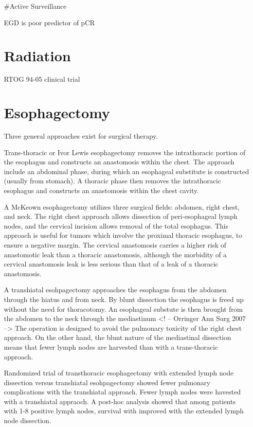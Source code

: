 \documentclass[
]{book}
\begin{document}
\#Active Surveillance

EGD is poor predictor of pCR \citep{sarkaria764}

\hypertarget{radiation}{%
\chapter{Radiation}\label{radiation}}

RTOG 94-05 clinical trial \citep{minsky1167}

\hypertarget{esophagectomy}{%
\chapter{Esophagectomy}\label{esophagectomy}}

Three general approaches exist for surgical therapy.

Trans-thoracic or Ivor Lewis esophagectomy\citep{visbal1803} removes the intrathoracic portion of the esophagus and constructs an anastomosis within the chest. The approach include an abdominal phase, during which an esophageal substitute is constructed (usually from stomach). A thoracic phase then removes the intrathoracic esophagus and constructs an anastomosis within the chest cavity.

A McKeown esophagectomy utilizes three surgical fields: abdomen, right chest, and neck. The right chest approach allows dissection of peri-esophageal lymph nodes, and the cervical incision allows removal of the total esophagus.\citep{mckeown259} This approach is useful for tumors which involve the proximal thoracic esophagus, to ensure a negative margin. The cervical anastomosis carries a higher risk of anastomotic leak than a thoracic anastomosis, although the morbidity of a cervical anastomosis leak is less serious than that of a leak of a thoracic anastomosis.

A transhiatal esohpagectomy approaches the esophagus from the abdomen through the hiatus and from neck. By blunt dissection the esophagus is freed up without the need for thoracotomy. An esophageal substute is then brought from the abdomen to the neck through the mediastinum\citep{orringer643} \citep{orringer363}\textless! -- Orringer Ann Surg 2007 --\textgreater{} The operation is designed to avoid the pulmonary toxicity of the right chest approach. On the other hand, the blunt nature of the mediastinal dissection means that fewer lymph nodes are harvested than with a trans-thoracic approach.

Randomized trial of transthoracic esophagectomy with extended lymph node dissection versus transhiatal esohpagectomy showed fewer pulmonary complications with the transhiatal approach. \citep{hulscher1662} Fewer lymph nodes were havested with a transhiatal appraoch. A post-hoc analysis showed that among patients with 1-8 positive lymph nodes, survival with improved with the extended lymph node dissection.\citep{omloo992}
\end{document}
